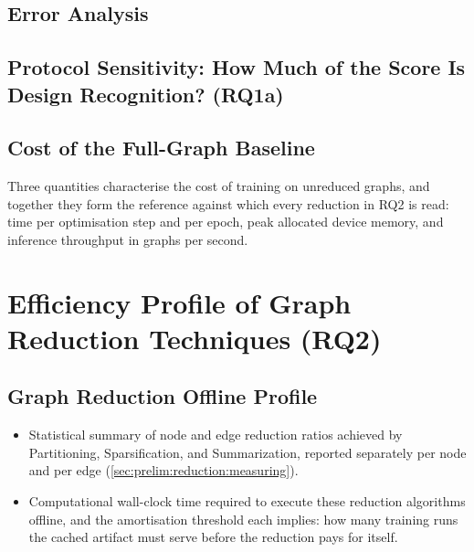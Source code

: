 \subsection{Error Analysis}
\label{sec:results:rq1:erroranalysis}

\subsection{Protocol Sensitivity: How Much of the Score Is Design Recognition? (RQ1a)}
\label{sec:results:rq1:protocol}

\subsection{Cost of the Full-Graph Baseline}
\label{sec:results:rq1:hardware}
Three quantities characterise the cost of training on unreduced graphs, and together they
form the reference against which every reduction in RQ2 is read: time per optimisation step
and per epoch, peak allocated device memory, and inference throughput in graphs per second.


\section{Efficiency Profile of Graph Reduction Techniques (RQ2)}
\label{sec:results:rq2}

\subsection{Graph Reduction Offline Profile}
\label{sec:results:rq2:offline}
\begin{itemize}
    \item Statistical summary of node and edge reduction ratios achieved by Partitioning,
    Sparsification, and Summarization, reported separately per node and per edge
    (\ref{sec:prelim:reduction:measuring}).
    \item Computational wall-clock time required to execute these reduction algorithms
    offline, and the amortisation threshold each implies: how many training runs the cached
    artifact must serve before the reduction pays for itself.
\end{itemize}

